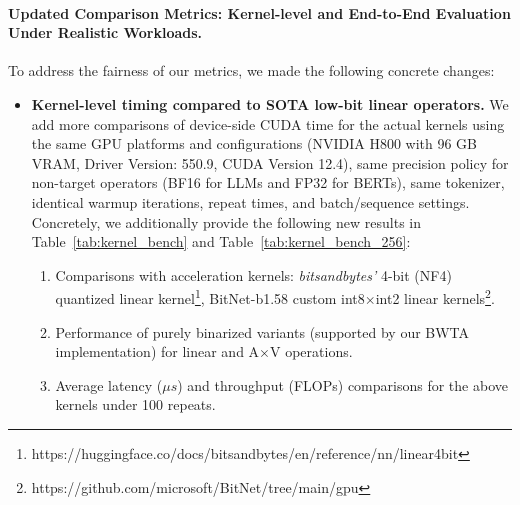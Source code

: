 \begin{revmeta}[]
\paragraph{Updated Comparison Metrics: Kernel-level and End-to-End Evaluation Under Realistic Workloads. } 
To address the fairness of our metrics, we made the following concrete changes: 
\begin{itemize}
    \item \textbf{Kernel-level timing compared to SOTA low-bit linear operators.} We add more comparisons of device-side CUDA time for the actual kernels using the same GPU platforms and configurations (NVIDIA H800 with 96 GB VRAM, Driver Version: 550.9, CUDA Version 12.4), same precision policy for non-target operators (BF16 for LLMs and FP32 for BERTs), same tokenizer, identical warmup iterations, repeat times, and batch/sequence settings. 
    Concretely, we additionally provide the following new results in Table~\ref{tab:kernel_bench} and Table~\ref{tab:kernel_bench_256}:
    \begin{enumerate}[label={(\arabic*)}]
        \item Comparisons with acceleration kernels: \textit{bitsandbytes'} 4-bit (NF4) quantized linear kernel\footnote{https://huggingface.co/docs/bitsandbytes/en/reference/nn/linear4bit}, BitNet-b1.58 custom int8$\times$int2 linear kernels\footnote{https://github.com/microsoft/BitNet/tree/main/gpu}.
        \item Performance of purely binarized variants (supported by our BWTA implementation) for linear and A$\times$V operations. 
        \item Average latency ($\mu s$) and throughput (FLOPs) comparisons for the above kernels under 100 repeats. 
    \end{enumerate}
    

\end{itemize}
\end{revmeta}
